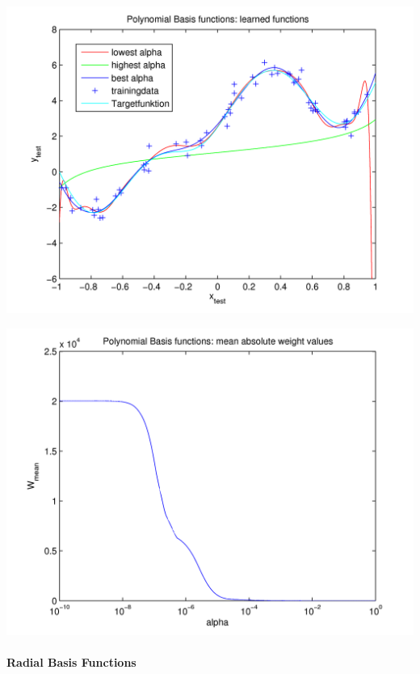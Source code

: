   \begin{center}
	\includegraphics[width=15cm]{figures/114/poly_learned.png}
	\label{fig:poly_learned}
  \end{center}

  \begin{center}
	\includegraphics[width=15cm]{figures/114/poly_meanweight.png}
	\label{fig:poly_meanweight}
  \end{center}


\paragraph{Radial Basis Functions}

